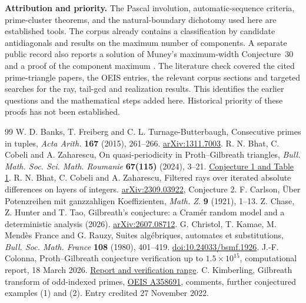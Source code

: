 \documentclass[11pt,a4paper]{article}
\begin{document}
\smallskip
\noindent\textbf{Attribution and priority.}
The Pascal involution, automatic-sequence criteria, prime-cluster theorems, and the natural-boundary dichotomy used here are established tools. The corpus already contains a classification by candidate antidiagonals and results on the maximum number of components. A separate public record also reports a solution of Muney's maximum-width Conjecture~30 and a proof of the component maximum \cite{components}. The literature check covered the cited prime-triangle papers, the OEIS entries, the relevant corpus sections and targeted searches for the ray, tail-gcd and realization results. This identifies the earlier questions and the mathematical steps added here. Historical priority of these proofs has not been established.

\begin{thebibliography}{99}\small
{} W. D. Banks, T. Freiberg and C. L. Turnage-Butterbaugh, Consecutive primes in tuples, \emph{Acta Arith.} \textbf{167} (2015), 261--266. \href{https://arxiv.org/abs/1311.7003}{arXiv:1311.7003}.
 R. N. Bhat, C. Cobeli and A. Zaharescu, On quasi-periodicity in Proth--Gilbreath triangles, \emph{Bull. Math. Soc. Sci. Math. Roumanie} \textbf{67(115)} (2024), 3--21. \href{https://rms.unibuc.ro/bulletin/pdf/67-1/articol_1.pdf}{Conjecture 1 and Table 1}.
 R. N. Bhat, C. Cobeli and A. Zaharescu, Filtered rays over iterated absolute differences on layers of integers. \href{https://arxiv.org/abs/2309.03922}{arXiv:2309.03922}, Conjecture 2.
 F. Carlson, Über Potenzreihen mit ganzzahligen Koeffizienten, \emph{Math. Z.} \textbf{9} (1921), 1--13.
 Z. Chase, Z. Hunter and T. Tao, Gilbreath's conjecture: a Cramér random model and a deterministic analysis (2026). \href{https://arxiv.org/abs/2607.08712}{arXiv:2607.08712}.
 G. Christol, T. Kamae, M. Mendès France and G. Rauzy, Suites algébriques, automates et substitutions, \emph{Bull. Soc. Math. France} \textbf{108} (1980), 401--419. \href{https://doi.org/10.24033/bsmf.1926}{doi:10.24033/bsmf.1926}.
 J.-F. Colonna, Proth--Gilbreath conjecture verification up to $1.5\times10^{15}$, computational report, 18 March 2026. \href{https://www.lactamme.polytechnique.fr/Mosaic/descripteurs/Proth_Gilbreath_Conjecture.01.Ang.html}{Report and verification range}.
 C. Kimberling, Gilbreath transform of odd-indexed primes, \href{https://oeis.org/A358691/internal}{OEIS A358691}, comments, further conjectured examples (1) and (2). Entry credited 27 November 2022.

\end{thebibliography}
\end{document}
